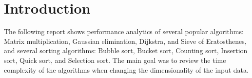 \chapter{Introduction}

The following report shows performance analytics of several popular algorithms: Matrix multiplication, Gaussian elimination, Dijkstra, and Sieve of Eratosthenes, and several sorting algorithms: Bubble sort, Bucket sort, Counting sort, Insertion sort, Quick sort, and Selection sort.
The main goal was to review the time complexity of the algorithms when changing the dimensionality of the input data.